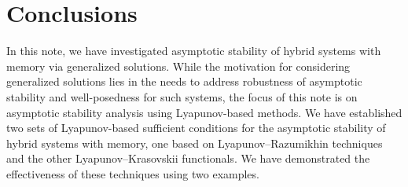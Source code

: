 \documentclass[journal,final,twocolumn]{IEEEtran}
\theoremstyle{definition}
\begin{document}
\section{Conclusions}

In this note, we have investigated asymptotic stability of hybrid systems with memory via generalized solutions. While the motivation for considering generalized solutions lies in the needs to address robustness of asymptotic stability and well-posedness for such systems, the focus of this note is on asymptotic stability analysis using Lyapunov-based methods. We have established two sets of Lyapunov-based sufficient conditions for the asymptotic stability of hybrid systems with memory, one based on Lyapunov--Razumikhin techniques and the other Lyapunov--Krasovskii functionals. We have demonstrated the effectiveness of these techniques using two examples.

\ifCLASSOPTIONcaptionsoff
  \newpage
\fi



\end{document}
